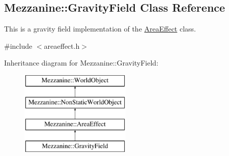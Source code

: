 \hypertarget{classMezzanine_1_1GravityField}{
\subsection{Mezzanine::GravityField Class Reference}
\label{classMezzanine_1_1GravityField}
}


This is a gravity field implementation of the \hyperlink{classMezzanine_1_1AreaEffect}{AreaEffect} class.  




{\ttfamily \#include $<$areaeffect.h$>$}

Inheritance diagram for Mezzanine::GravityField:\begin{figure}[H]
\begin{center}
\leavevmode
\includegraphics[height=4.000000cm]{classMezzanine_1_1GravityField}
\end{center}
\end{figure}
